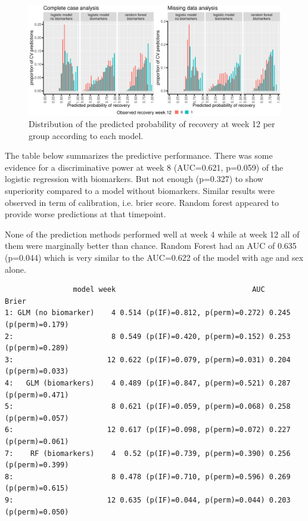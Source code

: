 \documentclass[12pt]{article}
\begin{document}
\begin{figure}[!h]
\centering
\includegraphics[trim={0 0 0 0},width=\textwidth]{./../figures/hist-pred-week12.pdf}
\caption{\label{fig:perfW12-dens}Distribution of the predicted probability of recovery at week 12 per group according to each model.}
\end{figure}

The table below summarizes the predictive performance. There was some
evidence for a discriminative power at week 8 (AUC=0.621, p=0.059) of
the logistic regression with biomarkers. But not enough (p=0.327) to
show superiority compared to a model without biomarkers. Similar
results were observed in term of calibration, i.e. brier score. Random
forest appeared to provide worse predictions at that timepoint.

\bigskip

None of the prediction methods performed well at week 4 while at week
12 all of them were marginally better than chance. Random Forest had
an AUC of 0.635 (p=0.044) which is very similar to the AUC=0.622 of
the model with age and sex alone.

\clearpage

\begin{verbatim}
                model week                                AUC                 Brier
1: GLM (no biomarker)    4 0.514 (p(IF)=0.812, p(perm)=0.272) 0.245 (p(perm)=0.179)
2:                       8 0.549 (p(IF)=0.420, p(perm)=0.152) 0.253 (p(perm)=0.289)
3:                      12 0.622 (p(IF)=0.079, p(perm)=0.031) 0.204 (p(perm)=0.033)
4:   GLM (biomarkers)    4 0.489 (p(IF)=0.847, p(perm)=0.521) 0.287 (p(perm)=0.471)
5:                       8 0.621 (p(IF)=0.059, p(perm)=0.068) 0.258 (p(perm)=0.057)
6:                      12 0.617 (p(IF)=0.098, p(perm)=0.072) 0.227 (p(perm)=0.061)
7:    RF (biomarkers)    4  0.52 (p(IF)=0.739, p(perm)=0.390) 0.256 (p(perm)=0.399)
8:                       8 0.478 (p(IF)=0.710, p(perm)=0.596) 0.269 (p(perm)=0.615)
9:                      12 0.635 (p(IF)=0.044, p(perm)=0.044) 0.203 (p(perm)=0.050)
\end{verbatim}
\end{document}
